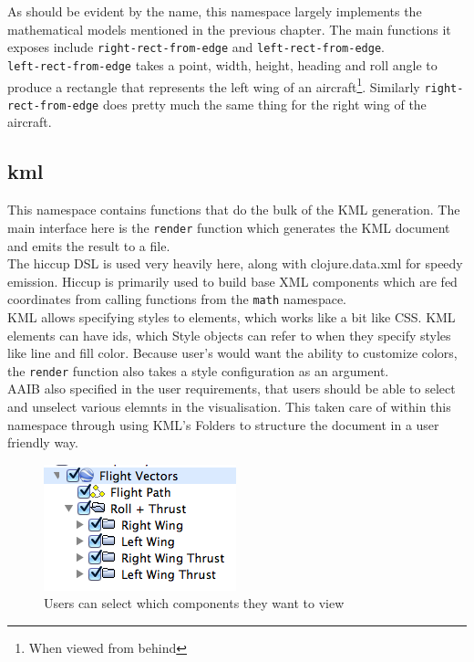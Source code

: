 As should be evident by the name, this namespace largely implements the mathematical models mentioned in the previous chapter. The main functions it exposes include \lstinline{right-rect-from-edge} and \lstinline{left-rect-from-edge}. \\

\lstinline{left-rect-from-edge} takes a point, width, height, heading and roll angle to produce a rectangle that represents the left wing of an aircraft\footnote{When viewed from behind}. Similarly \lstinline{right-rect-from-edge} does pretty much the same thing for the right wing of the aircraft.\\


\subsection{kml}

This namespace contains functions that do the bulk of the KML generation. The main interface here is the \lstinline{render} function which generates the KML document and emits the result to a file. \\

The hiccup DSL is used very heavily here, along with clojure.data.xml for speedy emission. Hiccup is primarily used to build base XML components which are fed coordinates from calling functions from the  \lstinline{math} namespace. \\

 KML allows specifying styles to elements, which works like a bit like CSS. KML elements can have ids, which Style objects can refer to when they specify styles like line and fill color. Because user's would want the ability to customize colors, the \lstinline{render} function also takes a style configuration as an argument. \\

AAIB also specified in the user requirements, that users should be able to select and unselect various elemnts in the visualisation. This taken care of within this namespace through using KML's Folders to structure the document in a user friendly way. \\

\begin{figure}[h]
\centering
  \includegraphics[scale=1]{gfx/kml-structure.png}
\caption{Users can select which components they want to view}
\end{figure}

